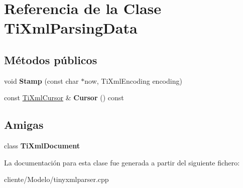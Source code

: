 \hypertarget{classTiXmlParsingData}{\section{\-Referencia de la \-Clase \-Ti\-Xml\-Parsing\-Data}
\label{classTiXmlParsingData}
}
\subsection*{\-Métodos públicos}
\begin{DoxyCompactItemize}
\item 
\hypertarget{classTiXmlParsingData_a65cee8ab77a36c605db08c84b4c30a7d}{void {\bfseries \-Stamp} (const char $\ast$now, \-Ti\-Xml\-Encoding encoding)}\label{classTiXmlParsingData_a65cee8ab77a36c605db08c84b4c30a7d}

\item 
\hypertarget{classTiXmlParsingData_a9e63d965fdb53ff4ac711e105269e918}{const \hyperlink{structTiXmlCursor}{\-Ti\-Xml\-Cursor} \& {\bfseries \-Cursor} () const }\label{classTiXmlParsingData_a9e63d965fdb53ff4ac711e105269e918}

\end{DoxyCompactItemize}
\subsection*{\-Amigas}
\begin{DoxyCompactItemize}
\item 
\hypertarget{classTiXmlParsingData_a173617f6dfe902cf484ce5552b950475}{class {\bfseries \-Ti\-Xml\-Document}}\label{classTiXmlParsingData_a173617f6dfe902cf484ce5552b950475}

\end{DoxyCompactItemize}


\-La documentación para esta clase fue generada a partir del siguiente fichero\-:\begin{DoxyCompactItemize}
\item 
cliente/\-Modelo/tinyxmlparser.\-cpp\end{DoxyCompactItemize}
